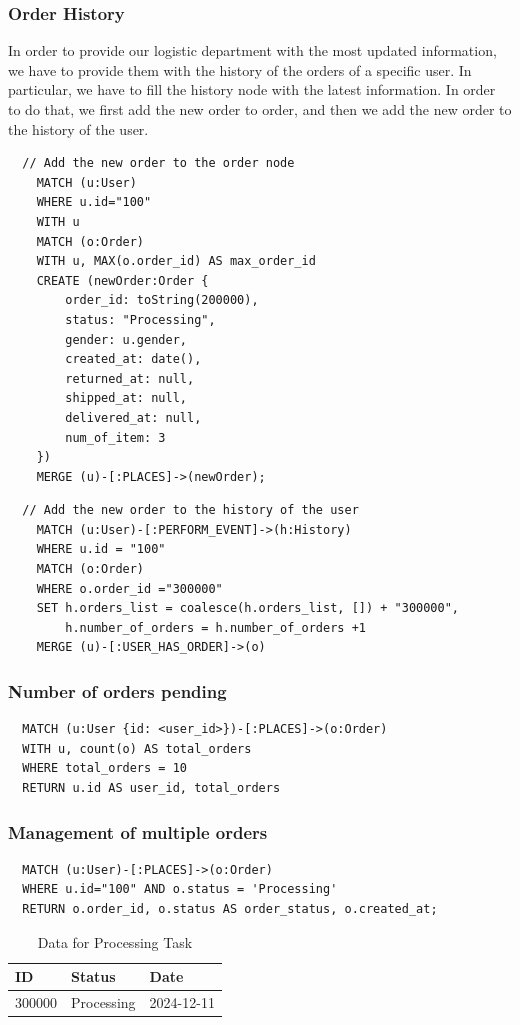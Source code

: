 \documentclass[a4paper,12pt]{article}
\begin{document}
\subsubsection{Order History}
In order to provide our logistic department with the most updated information, we have to provide them with the history of the orders of a specific user.
In particular, we have to fill the history node with the latest information. In order to do that, we first add the new order to order, and then we add the new order to the history of the user.
\begin{verbatim}
  // Add the new order to the order node
    MATCH (u:User)
    WHERE u.id="100"
    WITH u
    MATCH (o:Order)
    WITH u, MAX(o.order_id) AS max_order_id
    CREATE (newOrder:Order { 
        order_id: toString(200000), 
        status: "Processing",
        gender: u.gender,
        created_at: date(),
        returned_at: null,
        shipped_at: null,
        delivered_at: null,
        num_of_item: 3
    })
    MERGE (u)-[:PLACES]->(newOrder);
\end{verbatim}
\begin{verbatim}
  // Add the new order to the history of the user
    MATCH (u:User)-[:PERFORM_EVENT]->(h:History)
    WHERE u.id = "100"
    MATCH (o:Order)
    WHERE o.order_id ="300000"
    SET h.orders_list = coalesce(h.orders_list, []) + "300000",
        h.number_of_orders = h.number_of_orders +1
    MERGE (u)-[:USER_HAS_ORDER]->(o)
\end{verbatim}

\subsubsection{Number of orders pending}
\begin{verbatim}
  MATCH (u:User {id: <user_id>})-[:PLACES]->(o:Order)
  WITH u, count(o) AS total_orders
  WHERE total_orders = 10
  RETURN u.id AS user_id, total_orders
\end{verbatim}

\subsubsection{Management of multiple orders}
\begin{verbatim}
  MATCH (u:User)-[:PLACES]->(o:Order)
  WHERE u.id="100" AND o.status = 'Processing'  
  RETURN o.order_id, o.status AS order_status, o.created_at;

\end{verbatim}
  \begin{table}[h!]
    \centering
    \caption{Data for Processing Task}
    \label{tab:processing_data}
    \begin{tabular}{l l l}
        \toprule
        \textbf{ID} & \textbf{Status} & \textbf{Date} \\
        \midrule
        300000 & Processing & 2024-12-11 \\
        \bottomrule
    \end{tabular}
\end{table}
\end{document}
